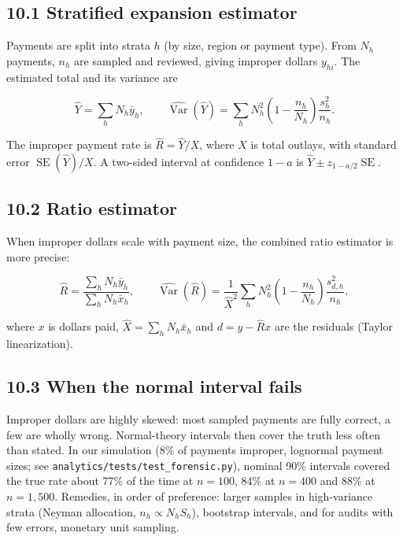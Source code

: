 \documentclass[letterpaper,11pt]{article}
\begin{document}
\hypertarget{stratified-expansion-estimator}{%
\subsection*{10.1 Stratified expansion
estimator}\label{stratified-expansion-estimator}}

Payments are split into strata \(h\) (by size, region or payment type).
From \(N_h\) payments, \(n_h\) are sampled and reviewed, giving improper
dollars \(y_{hi}\). The estimated total and its variance are

\[\hat Y = \sum_h N_h \bar y_h, \qquad
\widehat{\operatorname{Var}}(\hat Y) = \sum_h N_h^2 \left(1 - \frac{n_h}{N_h}\right)\frac{s_h^2}{n_h}.\]

The improper payment rate is \(\hat R = \hat Y / X\), where \(X\) is
total outlays, with standard error \(\operatorname{SE}(\hat Y)/X\). A
two-sided interval at confidence \(1-a\) is
\(\hat Y \pm z_{1-a/2}\operatorname{SE}\).

\hypertarget{ratio-estimator}{%
\subsection*{10.2 Ratio estimator}\label{ratio-estimator}}

When improper dollars scale with payment size, the combined ratio
estimator is more precise:

\[\hat R = \frac{\sum_h N_h \bar y_h}{\sum_h N_h \bar x_h}, \qquad
\widehat{\operatorname{Var}}(\hat R) = \frac{1}{\hat X^2} \sum_h N_h^2 \left(1 - \frac{n_h}{N_h}\right)\frac{s_{d,h}^2}{n_h},\]

where \(x\) is dollars paid, \(\hat X = \sum_h N_h \bar x_h\) and
\(d = y - \hat R x\) are the residuals (Taylor linearization).

\hypertarget{when-the-normal-interval-fails}{%
\subsection*{10.3 When the normal interval
fails}\label{when-the-normal-interval-fails}}

Improper dollars are highly skewed: most sampled payments are fully
correct, a few are wholly wrong. Normal-theory intervals then cover the
truth less often than stated. In our simulation (8\% of payments
improper, lognormal payment sizes; see
\texttt{analytics/tests/test\_forensic.py}), nominal 90\% intervals
covered the true rate about 77\% of the time at \(n = 100\), 84\% at
\(n = 400\) and 88\% at \(n = 1{,}500\). Remedies, in order of
preference: larger samples in high-variance strata (Neyman allocation,
\(n_h \propto N_h S_h\)), bootstrap intervals, and for audits with few
errors, monetary unit sampling.
\end{document}
